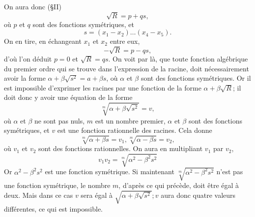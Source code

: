 \documentclass[oneside, 12 pt, leqno]{memoir}
\begin{document}
On aura donc (\S II)
\[\sqrt{R}=p+q s,\]
où \(p\) et \(q\) sont des fonctions symétriques, et
\[s=\left(x_1-x_2\right) \dots\left(x_4-x_5\right).\]
On en tire, en échangeant \(x_1\) et \(x_2\) entre eux,
\[-\sqrt{R}=p-q s,\]
d'où l'on déduit \(p=0\) et \(\sqrt{R}= q s\). On voit par là, que toute fonction algébrique du premier ordre qui se trouve dans l'expression de la racine, doit nécessairement avoir la forme \(\alpha+\beta \sqrt{s^2}=a+\beta s\), où \(\alpha\) et \(\beta\) sont des fonctions symétriques. Or il est impossible d'exprimer les racines par une fonction de la forme \(\alpha+\beta \sqrt{R}\); il doit donc y avoir une équation de la forme
\[\sqrt[m]{\alpha+\beta \sqrt{s^2}}=v,\]
où \(\alpha\) et \(\beta\) ne sont pas nuls, \(m\) est un nombre premier, \(\alpha\) et \(\beta\) sont des fonctions symétriques, et \(v\) est une fonction rationnelle des racines. Cela donne
\[\sqrt[m]{\alpha+\beta s}=v_1, \sqrt[m]{\alpha-\beta s}=v_2,\]
où \(v_1\) et \(v_2\) sont des fonctions rationnelles. On aura en multipliant \(v_1\) par \(v_2\),
\[v_1 v_2=\sqrt[m]{\alpha^2-\beta^2 s^2}\]
Or \(\alpha^2-\beta^2 s^2\) est une fonction symétrique. Si maintenant \(\sqrt[m]{\alpha^2-\beta^2 s^2}\) n'est pas une fonction symétrique, le nombre \(m\), d'après ce qui précède, doit être égal à deux. Mais dans ce cas \(v\) sera égal à \(\sqrt{\alpha+\beta \sqrt{s^2}} ; v\) aura donc quatre valeurs différentes, ce qui est impossible.
\end{document}
